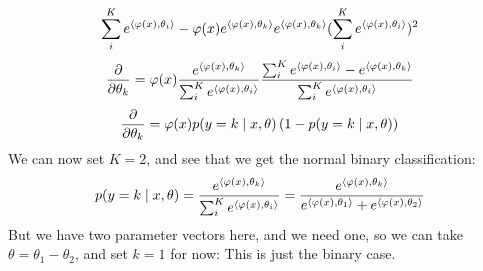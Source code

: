 \documentclass[12pt]{article}
\begin{document}
\begin{enumerate}[label = \letters]
\[{    \sum_i^K e^{\left\langle \varphi(x), \theta_i \right\rangle}
    - \varphi(x)e^{\left\langle \varphi(x), \theta_k \right\rangle}
    e^{\left\langle \varphi(x), \theta_k \right\rangle}}
    {(\sum_i^K e^{\left\langle \varphi(x), \theta_i \right\rangle})^2} \]
    \[ \dfrac{\partial }{\partial \theta_k}
    = \varphi(x) \dfrac{
    e^{\left\langle \varphi(x), \theta_k \right\rangle}}
    {\sum_i^K e^{\left\langle \varphi(x), \theta_i \right\rangle}}
    \dfrac{\sum_i^K e^{\left\langle \varphi(x), \theta_i \right\rangle}
    - e^{\left\langle \varphi(x), \theta_k \right\rangle}}
    {\sum_i^K e^{\left\langle \varphi(x), \theta_i \right\rangle}} \]
    \[ \dfrac{\partial }{\partial \theta_k}
    = \varphi(x) p(y = k \mid x, \theta)
    \left( 1 - p(y = k \mid x, \theta) \right) \]
    We can now set $K = 2$,
    and see that we get the normal binary
    classification:
    \[  p(y = k \mid x, \theta) = 
    \dfrac{e^{\left\langle \varphi(x), \theta_k \right\rangle}}
    {\sum_i^K e^{\left\langle \varphi(x), \theta_i \right\rangle}}
    = \dfrac{e^{\left\langle \varphi(x), \theta_k \right\rangle}}
    {e^{\left\langle \varphi(x), \theta_1 \right\rangle}
    + e^{\left\langle \varphi(x), \theta_2 \right\rangle}}\]
    But we have two parameter vectors here,
    and we need one, so we can take
    $\theta = \theta_1 - \theta_2$,
    and set $k = 1$ for now:
    This is just the binary case. \\
\end{enumerate}
\end{document}
